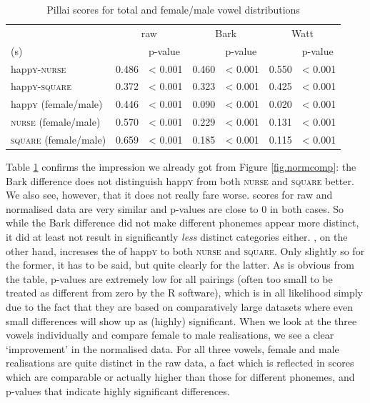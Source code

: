 \begin{table}[h]
	\centering
	\caption{Pillai scores for total and female/male vowel distributions}
	\begin{tabular}{lllllll}
		\hline
		& \multicolumn{2}{c}{raw} & \multicolumn{2}{c}{Bark} & \multicolumn{2}{c}{Watt}\\
		\isi{vowel}(s) & \isi{Pillai} & p-value & \isi{Pillai} & p-value & \isi{Pillai} & p-value\\
		\hline
		happ\textsc{y}-\textsc{nurse} &
		0.486 &
		< 0.001 &
		0.460 &
		< 0.001 &
		0.550 &
		< 0.001\\
		happ\textsc{y}-\textsc{square} &
		0.372 &
		< 0.001 &
		0.323 &
		< 0.001 &
		0.425 &
		< 0.001 \\
		happ\textsc{y} (female/male) &
		0.446 &
		< 0.001 &
		0.090 &
		< 0.001 &
		0.020 &
		< 0.001 \\
		\textsc{nurse} (female/male) &
		0.570 &
		< 0.001 &
		0.229 &
		< 0.001 &
		0.131 &
		< 0.001 \\
		\textsc{square} (female/male) &
		0.659 &
		< 0.001 &
		0.185 &
		< 0.001 &
		0.115 &
		< 0.001 \\
		\hline
	\end{tabular}
	\label{tab.pillai}
\end{table}

Table \ref{tab.pillai} confirms the impression we already got from Figure \ref{fig.normcomp}: the Bark difference  does not distinguish happ\textsc{y} from both \textsc{nurse} and \textsc{square} better.
We also see, however, that it does not really fare worse.
 scores for raw and normalised data are very similar and p-values are close to 0 in both cases.
So while the Bark difference  did not make different phonemes appear more distinct, it did at least not result in significantly \emph{less} distinct categories either.
\citeauthor{wattfabricius2002}, on the other hand, increases the  of happ\textsc{y} to both \textsc{nurse} and \textsc{square}.
Only slightly so for the former, it has to be said, but quite clearly for the latter.
As is obvious from the table, p-values are extremely low for all pairings (often too small to be treated as different from zero by the R software), which is in all likelihood simply due to the fact that they are based on comparatively large datasets where even small differences will show up as (highly) significant.
When we look at the three vowels individually and compare female to male realisations, we see a clear `improvement' in the normalised data.
For all three vowels, female and male realisations are quite distinct in the raw data, a fact which is reflected in  scores which are comparable or actually higher than those for different phonemes, and p-values that indicate highly significant differences. 

